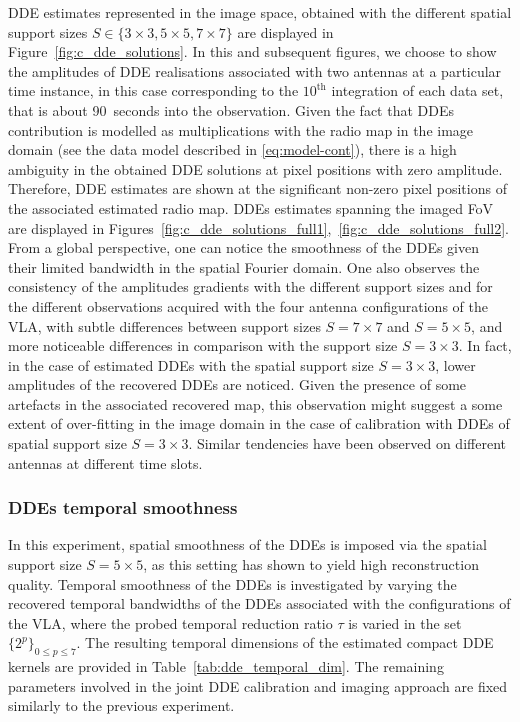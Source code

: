 \documentclass[fleqn,usenatbib]{mnras}
\begin{document}
DDE estimates represented in the image space, obtained with the different spatial support sizes $S\in\{3\times 3,5\times 5,7\times7\}$ are displayed in Figure~\ref{fig:c_dde_solutions}. In this and subsequent figures, we choose to show the amplitudes of DDE realisations associated with two antennas at a particular time instance, in this case corresponding to the $10^{\textrm{th}}$ integration of each data set, that is about 90~seconds into the observation.
 Given the fact that DDEs contribution is modelled as multiplications with the radio map in the image domain (see the data model described in \eqref{eq:model-cont}), there is a high ambiguity in the obtained DDE solutions at pixel positions with zero amplitude. Therefore, DDE estimates are shown at the significant non-zero pixel positions of the associated estimated radio map. {{ DDEs estimates spanning the imaged FoV are displayed in  Figures~\ref{fig:c_dde_solutions_full1},~\ref{fig:c_dde_solutions_full2}.}} From a global perspective, one can notice the smoothness of the DDEs given their limited bandwidth in the spatial Fourier domain. One also observes the consistency of the amplitudes gradients with the different support sizes and for the different observations acquired with the four antenna configurations of the {{VLA}}, with subtle differences between support sizes $S=7\times 7$ and $S=5\times 5$, and more noticeable differences in comparison with the support size $S=3\times 3$. In fact, in the case of estimated DDEs with the spatial support size $S=3\times 3$, lower amplitudes of the recovered DDEs are noticed. Given the presence of some artefacts in the associated recovered map, this observation might suggest a some extent of over-fitting in the image domain in the case of calibration with DDEs of spatial support size $S=3\times 3$. Similar tendencies have been observed on different antennas at different time slots. 
\vspace{-0.5cm}
\subsubsection*{DDEs temporal smoothness}%
In this experiment, spatial smoothness of the DDEs is imposed via the spatial support size $S=5\times 5$, as this setting has shown to yield high reconstruction quality. Temporal smoothness of the DDEs is investigated by varying the recovered temporal bandwidths of the DDEs associated with the configurations of the {{VLA}}, where the probed temporal reduction ratio $\tau$ is varied in the set $\{ 2^p\}_{0\leq p \leq7}$. The resulting temporal dimensions of the estimated compact DDE kernels are provided in Table~\ref{tab:dde_temporal_dim}. The remaining parameters involved in the joint DDE calibration and imaging approach are fixed similarly to the previous experiment.

\end{document}
